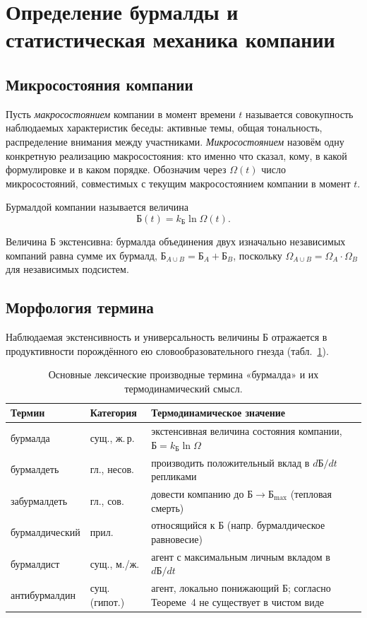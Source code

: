 \documentclass[11pt,a4paper]{article}
\newcommand{\Burm}{\text{Б}}
\newcommand{\kB}{k_{\text{Б}}}
\begin{document}
\section{Определение бурмалды и статистическая механика компании}

\subsection{Микросостояния компании}

Пусть \emph{макросостоянием} компании в момент времени $t$ называется совокупность наблюдаемых характеристик беседы: активные темы, общая тональность, распределение внимания между участниками. \emph{Микросостоянием} назовём одну конкретную реализацию макросостояния: кто именно что сказал, кому, в какой формулировке и в каком порядке. Обозначим через $\Omega(t)$ число микросостояний, совместимых с текущим макросостоянием компании в момент $t$.

\begin{definition}[Бурмалда]
Бурмалдой компании называется величина
\[
\Burm(t) = \kB \ln \Omega(t).
\]
\end{definition}

Величина $\Burm$ экстенсивна: бурмалда объединения двух изначально независимых компаний равна сумме их бурмалд, $\Burm_{A\cup B}=\Burm_A+\Burm_B$, поскольку $\Omega_{A\cup B}=\Omega_A\cdot\Omega_B$ для независимых подсистем.

\subsection{Морфология термина}

Наблюдаемая экстенсивность и универсальность величины $\Burm$ отражается в продуктивности порождённого ею словообразовательного гнезда (табл.~\ref{tab:lexicon}).

\begin{table}[h!]
\centering
\caption{Основные лексические производные термина «бурмалда» и их термодинамический смысл.}
\label{tab:lexicon}
\begin{tabular}{@{}p{3.6cm}p{2.0cm}p{7.9cm}@{}}
\toprule
Термин & Категория & Термодинамическое значение \\
\midrule
бурмалда & сущ., ж.\,р. & экстенсивная величина состояния компании, $\Burm=\kB\ln\Omega$ \\[3pt]
бурмалдеть & гл., несов. & производить положительный вклад в $d\Burm/dt$ репликами \\[3pt]
забурмалдеть & гл., сов. & довести компанию до $\Burm\to\Burm_{\max}$ (тепловая смерть) \\[3pt]
бурмалдический & прил. & относящийся к $\Burm$ (напр. бурмалдическое равновесие) \\[3pt]
бурмалдист & сущ., м./ж. & агент с максимальным личным вкладом в $d\Burm/dt$ \\[3pt]
антибурмалдин & сущ. (гипот.) & агент, локально понижающий $\Burm$; согласно Теореме~4 не существует в чистом виде \\
\bottomrule
\end{tabular}
\end{table}
\end{document}
